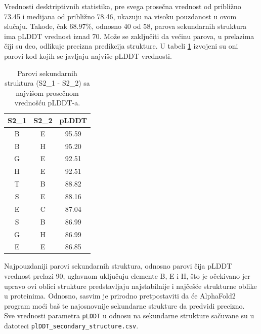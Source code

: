 \documentclass[a4paper,12pt]{article}
\begin{document}
Vrednosti desktriptivnih statistika, pre svega prosečna vrednost od približno 73.45 i medijana od približno 78.46, ukazuju na visoku pouzdanost u ovom slučaju. Takođe, čak $68.97\%$, odnosno 40 od 58, parova sekundarnih struktura ima pLDDT vrednost iznad 70. Može se zaključiti da većinu parova, u prelazima čiji su deo, odlikuje precizna predikcija strukture. U tabeli \ref{Tabela:9} izvojeni su oni parovi kod kojih se javljaju najviše pLDDT vrednosti.
\begin{table}[h!]
\centering
\begin{tabular}{|c|c|c|}
\hline
\textbf{S2\_1} & \textbf{S2\_2} & \textbf{pLDDT} \\
\hline
B & E & 95.59 \\
\hline
B & H & 95.20 \\
\hline
G & E & 92.51 \\
\hline
H & E & 92.51 \\
\hline
T & B & 88.82 \\
\hline
S & E & 88.16 \\
\hline
E & C & 87.04 \\
\hline
S & B & 86.99 \\
\hline
G & H & 86.99 \\
\hline
E & E & 86.85 \\
\hline
\end{tabular}
\caption{Parovi sekundarnih struktura (S2\_1 - S2\_2) sa najvišom prosečnom vrednošću pLDDT-a.}
\label{Tabela:9}
\end{table}
\newpage
Najpouzdaniji parovi sekundarnih struktura, odnosno parovi čija pLDDT vrednost prelazi 90, uglavnom uključuju elemente B, E i H, što je očekivano jer upravo ovi oblici strukture predstavljaju najstabilnije i najčešće strukturne oblike u proteinima. Odnosno, sasvim je prirodno pretpostaviti da će AlphaFold2 program moći baš te najosnovnije sekundarne strukture da predvidi precizno.\\
Sve vrednosti parametra \texttt{pLDDT} u odnosu na sekundarne strukture sačuvane su u datoteci \texttt{plDDT\_secondary\_structure.csv}.
\end{document}
